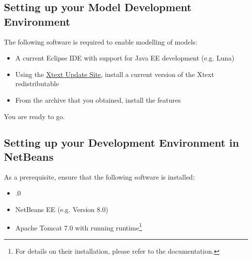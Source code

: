 
\subsection{Setting up your \MD Model Development Environment}

The following software is required to enable modelling of \MD models:

\begin{itemize}
\item A current Eclipse IDE with support for Java EE development (e.g. Luna)
\item Using the \href{https://eclipse.org/Xtext/download.html}{Xtext Update Site}, install a current version of the Xtext redistributable
\item From the archive that you obtained, install the \MD features
\end{itemize}

You are ready to go.


\subsection{Setting up your \mapapps Development Environment in NetBeans}
\label{subsec:basic-setup}

As a prerequisite, ensure that the following software is installed:

\begin{itemize}
\item {}.0
\item NetBeans EE (e.g. Version 8.0)
\item Apache Tomcat 7.0 with running \mapapps runtime\footnote{For details on their installation, please refer to the \mapapps documentation.}
\end{itemize}

